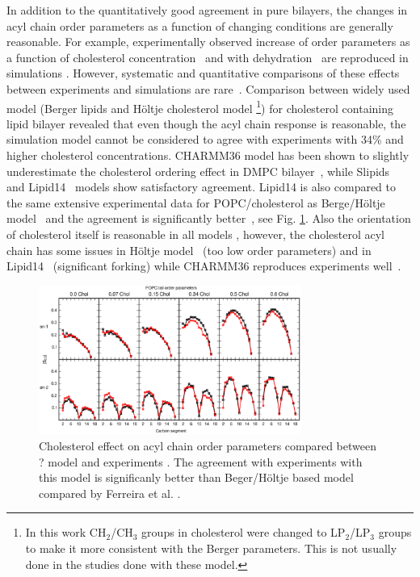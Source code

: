 \documentclass[aps,prl,superscriptaddress,twocolumn]{revtex4}
\begin{document}
In addition to the quantitatively good agreement in pure bilayers, the changes in 
acyl chain order parameters as a function of changing conditions are generally reasonable.
For example, experimentally observed increase of order parameters as a function of cholesterol 
concentration~\cite{dufourc84,lafleur90,urbina95,vermeer07,ferreira13} and with dehydration~\cite{mallikarjunaiah11,dvinskikh05b} 
are reproduced in simulations \cite{mashl01,hogberg06,vermeer07,zhu07,lim12,ferreira13,jambeck13,madej15}. 
However, systematic and quantitative comparisons of these effects between experiments and simulations are rare~\cite{ferreira13,madej15}.
Comparison between widely used model (Berger lipids \cite{berger97} and H{\"o}ltje cholesterol model \cite{holtje01}
\footnote{In this work CH$_2$/CH$_3$ groups in cholesterol were changed to LP$_2$/LP$_3$ groups to make it more consistent with the Berger
parameters. This is not usually done in the studies done with these model.})
for cholesterol containing lipid bilayer revealed that even though the acyl chain response is reasonable,
the simulation model cannot be considered to agree with experiments with 34\% and higher cholesterol concentrations.
CHARMM36 model has been shown to slightly underestimate the cholesterol ordering effect in DMPC bilayer~\cite{lim12},
while Slipids~\cite{jambeck13} and Lipid14~\cite{madej15} models show satisfactory agreement. Lipid14 is also compared to the same
extensive experimental data for POPC/cholesterol as Berge/H{\"o}ltje model~\cite{ferreira13} and the agreement is 
significantly better~\cite{madej15}, see Fig. \ref{cholTAILmadej}. 
Also the orientation of cholesterol itself is reasonable in all models \cite{vermeer07,lim12,ferreira13,madej15}, however, the cholesterol
acyl chain has some issues in H{\"o}ltje model~\cite{ferreira13} (too low order parameters) and in Lipid14~\cite{madej15} (significant forking) while
CHARMM36 reproduces experiments well~\cite{lim12}. 
\begin{figure}[]
  \includegraphics[width=8.6cm]{../Fig/cholTAILmadej.eps}
\newline
  \caption{\label{cholTAILmadej}
    Cholesterol effect on acyl chain order parameters compared between ? model \cite{madej15} and experiments \cite{ferreira13}.
    The agreement with experiments with this model is significanly better than Beger/H{\"o}ltje based model compared by 
    Ferreira et al. \cite{ferreira13}.
  } 
\end{figure}
\end{document}

